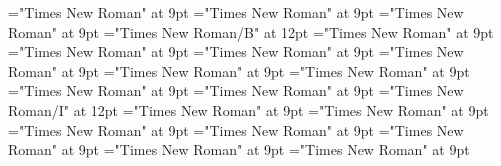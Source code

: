\documentclass[gps1,twoside]{article}
\begin{document}
\font\nontrivialentryrootnontrivialentryrootnontrivialentryrootscomplexformsnotsubentrycomplexformsnotsubentriessensesensessensesensesentrybefore="Times New Roman" at 9pt
\font\nontrivialentryrootscomplexformsnotsubentrycomplexformsnotsubentriessensesensessensesensesentrybefore="Times New Roman" at 9pt
\font\nontrivialentryrootscomplexformsnotsubentrycomplexformsnotsubentriessensesensessensesensesentryafter="Times New Roman" at 9pt
\font\nontrivialentryrootnontrivialentryrootscomplexformsnotsubentrycomplexformsnotsubentriessensesensessensesensesentry="Times New Roman/B" at 12pt
\font\complexformsnotsubentrycomplexformsnotsubentrycomplexformsnotsubentriesentrybefore="Times New Roman" at 9pt
\font\complexformsnotsubentriesentryafter="Times New Roman" at 9pt
\font\complexformtypescomplexformsnotsubentrycomplexformsnotsubentriesentryafter="Times New Roman" at 9pt
\font\spanspanreverseabbrcomplexformtypecomplexformtypescomplexformsnotsubentrycomplexformsnotsubentriesentrybefore="Times New Roman" at 9pt
\font\spanspanheadwordcomplexformsnotsubentrycomplexformsnotsubentriesentrybefore="Times New Roman" at 9pt
\font\spanheadwordcomplexformsnotsubentrycomplexformsnotsubentriesentrylastchildafter="Times New Roman" at 9pt
\font\morphosyntaxanalysismorphosyntaxanalysismorphosyntaxanalysescomplexformsnotsubentrycomplexformsnotsubentriesentrybefore="Times New Roman" at 9pt
\font\morphosyntaxanalysescomplexformsnotsubentrycomplexformsnotsubentriesentryafter="Times New Roman" at 9pt
\font\morphosyntaxanalysismorphosyntaxanalysescomplexformsnotsubentrycomplexformsnotsubentriesentry="Times New Roman/I" at 12pt
\font\spanspanpartofspeechmorphosyntaxanalysismorphosyntaxanalysescomplexformsnotsubentrycomplexformsnotsubentriesentrybefore="Times New Roman" at 9pt
\font\spanpartofspeechmorphosyntaxanalysismorphosyntaxanalysescomplexformsnotsubentrycomplexformsnotsubentriesentrylastchildafter="Times New Roman" at 9pt
\font\spanspanslotsmorphosyntaxanalysismorphosyntaxanalysescomplexformsnotsubentrycomplexformsnotsubentriesentrybefore="Times New Roman" at 9pt
\font\slotsmorphosyntaxanalysismorphosyntaxanalysescomplexformsnotsubentrycomplexformsnotsubentriesentrybefore="Times New Roman" at 9pt
\font\spanspannameslotslotsmorphosyntaxanalysismorphosyntaxanalysescomplexformsnotsubentrycomplexformsnotsubentriesentrybefore="Times New Roman" at 9pt
\font\spannameslotslotsmorphosyntaxanalysismorphosyntaxanalysescomplexformsnotsubentrycomplexformsnotsubentriesentrylastchildafter="Times New Roman" at 9pt
\font\spanspanowningentrysummarydefinitioncomplexformsnotsubentrycomplexformsnotsubentriesentrybefore="Times New Roman" at 9pt
\end{document}
